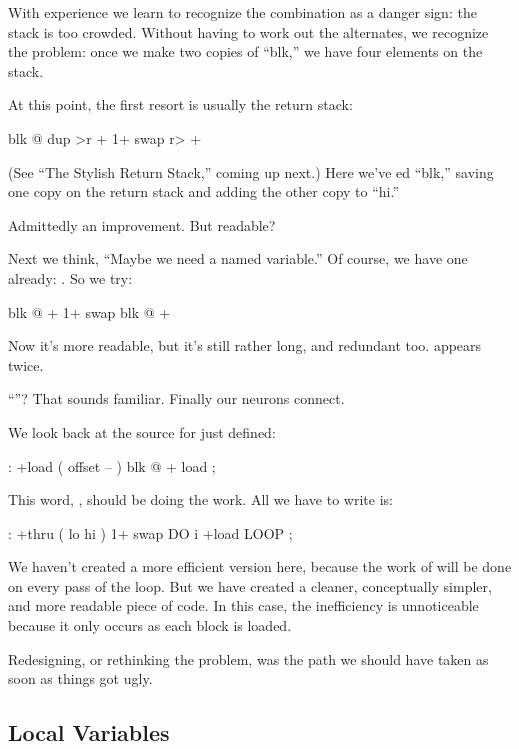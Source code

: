 With experience we learn to recognize the combination  as
a danger sign: the stack is too crowded. Without having to work out the
alternates, we recognize the problem: once we make two copies of ``blk,''
we have four elements on the stack.

\medbreak
At this point, the first resort is usually the return stack:

\begin{Code}
blk @  dup >r  + 1+  swap r> +
\end{Code}
(See ``The Stylish Return Stack,'' coming up next.) Here we've ed
``blk,'' saving one copy on the return stack and adding the other copy to
``hi.''

Admittedly an improvement. But readable?

Next we think, ``Maybe we need a named variable.'' Of course, we
have one already: . So we try:

\begin{Code}
blk @  + 1+  swap blk @ +
\end{Code}
Now it's more readable, but it's still rather long, and redundant too.
 appears twice.

``''? That sounds familiar. Finally our neurons connect.

We look back at the source for  just defined:

\begin{Code}
: +load  ( offset -- )  blk @ +  load ;
\end{Code}
This word, , should be doing the work. All we have to write is:

\begin{Code}
: +thru  ( lo hi )  1+ swap  DO  i +load  LOOP ;
\end{Code}
We haven't created a more efficient version here, because the work of
 will be done on every pass of the loop. But we have
created a cleaner, conceptually simpler, and more readable piece of code.
In this case, the inefficiency is unnoticeable because it only occurs as
each block is loaded.

Redesigning, or rethinking the problem, was the path we should
have taken as soon as things got ugly.%

\subsection{Local Variables}%
%
%
%
%

